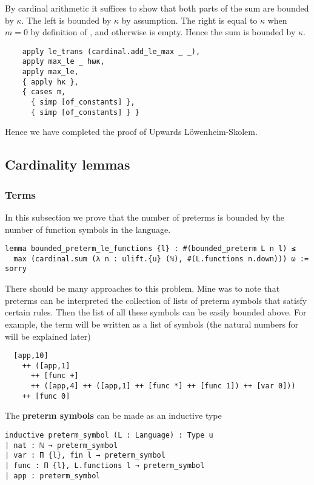 By cardinal arithmetic it suffices to show that both parts of the
sum are bounded by $\kappa$.
The left is bounded by $\kappa$ {by assumption}.
The right is equal to $\kappa$ when $m = 0$ by definition of
, and otherwise is empty.
Hence the sum is bounded by $\kappa$.

\begin{lstlisting}
    apply le_trans (cardinal.add_le_max _ _),
    apply max_le _ hωκ,
    apply max_le,
    { apply hκ },
    { cases m,
      { simp [of_constants] },
      { simp [of_constants] } } \end{lstlisting}

Hence we have completed the proof of Upwards L\"{o}wenheim-Skolem.

\subsection{Cardinality lemmas}

\subsubsection{Terms}

In this subsection we prove that the number of preterms is bounded by
the number of function symbols in the language.

\begin{lstlisting}
lemma bounded_preterm_le_functions {l} : #(bounded_preterm L n l) ≤
  max (cardinal.sum (λ n : ulift.{u} (ℕ), #(L.functions n.down))) ω := sorry \end{lstlisting}

There should be many approaches to this problem.
Mine was to note that preterms can be interpreted
the collection of lists of preterm symbols that satisfy certain rules.
Then the list of all these symbols can be easily bounded above.
For example, the term 
will be written as a list of symbols
(the natural numbers for  will be explained later)
\begin{lstlisting}
  [app,10]
    ++ ([app,1]
      ++ [func +]
      ++ ([app,4] ++ ([app,1] ++ [func *] ++ [func 1]) ++ [var 0]))
    ++ [func 0]
\end{lstlisting}

The \textbf{preterm symbols} can be made as an inductive type
\begin{lstlisting}
inductive preterm_symbol (L : Language) : Type u
| nat : ℕ → preterm_symbol
| var : Π {l}, fin l → preterm_symbol
| func : Π {l}, L.functions l → preterm_symbol
| app : preterm_symbol \end{lstlisting}

